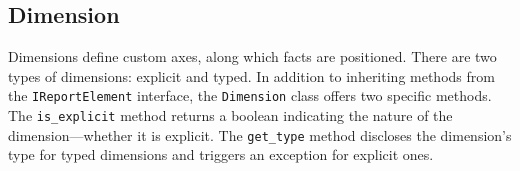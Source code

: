 


\subsection{Dimension}

Dimensions define custom axes, along which facts are positioned.
There are two types of dimensions: explicit and typed.
In addition to inheriting methods from the \texttt{IReportElement} interface,
the \texttt{Dimension} class offers two specific methods.
The \texttt{is\_explicit} method returns a boolean indicating the nature of the dimension—whether it is explicit.
The \texttt{get\_type} method discloses the dimension's type for typed dimensions and triggers an exception for explicit ones.


